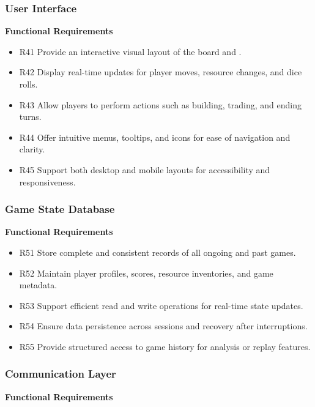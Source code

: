 \documentclass{article}
\begin{document}
\subsubsection{User Interface}

\textbf{Functional Requirements}

\begin{itemize}
  \item R41 Provide an interactive visual layout of the \emph{\Catan{}} board and \GameState{}.
  \item R42 Display real-time updates for player moves, resource changes, and dice rolls.
  \item R43 Allow players to perform actions such as building, trading, and ending turns.
  \item R44 Offer intuitive menus, tooltips, and icons for ease of navigation and clarity.
  \item R45 Support both desktop and mobile layouts for accessibility and responsiveness.

\end{itemize}

\subsubsection{Game State Database}

\textbf{Functional Requirements}

\begin{itemize}
  \item R51 Store complete and consistent records of all ongoing and past \emph{\Catan{}} games.
  \item R52 Maintain player profiles, scores, resource inventories, and game metadata.
  \item R53 Support efficient read and write operations for real-time state updates.
  \item R54 Ensure data persistence across sessions and recovery after interruptions.
  \item R55 Provide structured access to game history for analysis or replay features.

\end{itemize}

\subsubsection{Communication Layer}

\textbf{Functional Requirements}
\end{document}
